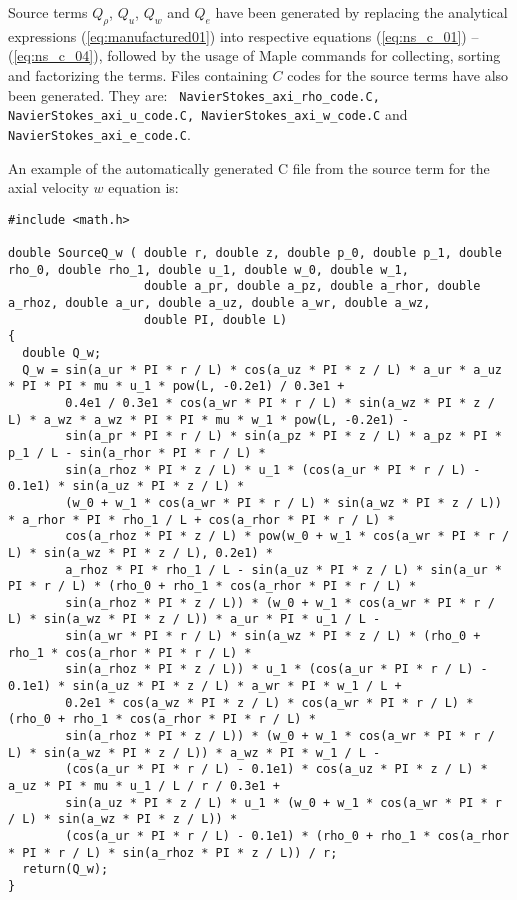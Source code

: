 \documentclass[a4paper,10pt]{article}
\begin{document}
\begin{landscape}
Source terms $Q_{\rho}$,  $Q_u$, $Q_w$ and  $Q_e$ have been generated by replacing the analytical expressions (\ref{eq:manufactured01}) into  respective equations (\ref{eq:ns_c_01}) -- (\ref{eq:ns_c_04}), followed by the usage of Maple commands for collecting, sorting and factorizing the terms. Files containing  $C$ codes for the source terms have also been generated. They are: \texttt{ NavierStokes\_axi\_rho\_code.C, NavierStokes\_axi\_u\_code.C, NavierStokes\_axi\_w\_code.C} and \texttt{NavierStokes\_axi\_e\_code.C}.

An example of the automatically generated C file from the source term for the axial velocity $w$ equation is:
\begin{verbatim}
#include <math.h>

double SourceQ_w ( double r, double z, double p_0, double p_1, double rho_0, double rho_1, double u_1, double w_0, double w_1,
                   double a_pr, double a_pz, double a_rhor, double a_rhoz, double a_ur, double a_uz, double a_wr, double a_wz,
                   double PI, double L)
{
  double Q_w;
  Q_w = sin(a_ur * PI * r / L) * cos(a_uz * PI * z / L) * a_ur * a_uz * PI * PI * mu * u_1 * pow(L, -0.2e1) / 0.3e1 +
        0.4e1 / 0.3e1 * cos(a_wr * PI * r / L) * sin(a_wz * PI * z / L) * a_wz * a_wz * PI * PI * mu * w_1 * pow(L, -0.2e1) -
        sin(a_pr * PI * r / L) * sin(a_pz * PI * z / L) * a_pz * PI * p_1 / L - sin(a_rhor * PI * r / L) *
        sin(a_rhoz * PI * z / L) * u_1 * (cos(a_ur * PI * r / L) - 0.1e1) * sin(a_uz * PI * z / L) *
        (w_0 + w_1 * cos(a_wr * PI * r / L) * sin(a_wz * PI * z / L)) * a_rhor * PI * rho_1 / L + cos(a_rhor * PI * r / L) *
        cos(a_rhoz * PI * z / L) * pow(w_0 + w_1 * cos(a_wr * PI * r / L) * sin(a_wz * PI * z / L), 0.2e1) *
        a_rhoz * PI * rho_1 / L - sin(a_uz * PI * z / L) * sin(a_ur * PI * r / L) * (rho_0 + rho_1 * cos(a_rhor * PI * r / L) *
        sin(a_rhoz * PI * z / L)) * (w_0 + w_1 * cos(a_wr * PI * r / L) * sin(a_wz * PI * z / L)) * a_ur * PI * u_1 / L -
        sin(a_wr * PI * r / L) * sin(a_wz * PI * z / L) * (rho_0 + rho_1 * cos(a_rhor * PI * r / L) *
        sin(a_rhoz * PI * z / L)) * u_1 * (cos(a_ur * PI * r / L) - 0.1e1) * sin(a_uz * PI * z / L) * a_wr * PI * w_1 / L +
        0.2e1 * cos(a_wz * PI * z / L) * cos(a_wr * PI * r / L) * (rho_0 + rho_1 * cos(a_rhor * PI * r / L) *
        sin(a_rhoz * PI * z / L)) * (w_0 + w_1 * cos(a_wr * PI * r / L) * sin(a_wz * PI * z / L)) * a_wz * PI * w_1 / L -
        (cos(a_ur * PI * r / L) - 0.1e1) * cos(a_uz * PI * z / L) * a_uz * PI * mu * u_1 / L / r / 0.3e1 +
        sin(a_uz * PI * z / L) * u_1 * (w_0 + w_1 * cos(a_wr * PI * r / L) * sin(a_wz * PI * z / L)) *
        (cos(a_ur * PI * r / L) - 0.1e1) * (rho_0 + rho_1 * cos(a_rhor * PI * r / L) * sin(a_rhoz * PI * z / L)) / r;
  return(Q_w);
}
\end{verbatim}
 


\end{landscape}
\end{document}
